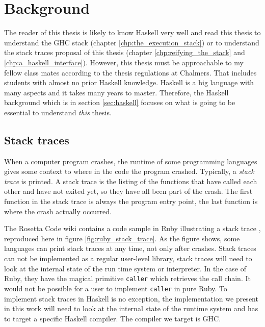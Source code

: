 \chapter{Background}

The reader of this thesis is likely to know Haskell very well
and read this thesis to understand the GHC stack (chapter
\ref{chp:the_execution_stack}) or to understand the stack traces
proposal of this thesis (chapter \ref{chp:reifying_the_stack}
and \ref{chp:a_haskell_interface}). However, this thesis must be
approachable to my fellow class mates according to the thesis
regulations at Chalmers. That includes students with almost no prior
Haskell knowledge. Haskell is a big language with many aspects and it
takes many years to master. Therefore, the Haskell background which is
in section \ref{sec:haskell} focuses on what is going to be essential to
understand \emph{this} thesis.

\section{Stack traces}

When a computer program crashes, the runtime of some programming languages
gives some context to where in the code the program crashed.
Typically, a \emph{stack trace} is printed. A stack trace is the listing
of the functions that have called each other and have not exited yet, so
they have all been part of the crash. The first function in the stack
trace is always the program entry point, the last function is where the
crash actually occurred.

The Rosetta Code wiki contains a code sample in Ruby illustrating a stack
trace \cite{rosetta_stone_st}, reproduced here in figure
\ref{fig:ruby_stack_trace}. As the figure shows, some languages can print stack
traces at any time, not only after crashes. Stack traces can not be
implemented as a regular user-level library, stack traces will need
to look at the internal state of the run time system or interpreter.
In the case of Ruby, they have the magical primitive \texttt{caller} which
retrieves the call chain. It would not be possible for a user
to implement \texttt{caller} in pure Ruby. To implement stack traces
in Haskell is no exception, the implementation we present in this work
will need to look at the internal state of the runtime system and has to
target a specific Haskell compiler. The compiler we target is GHC.

